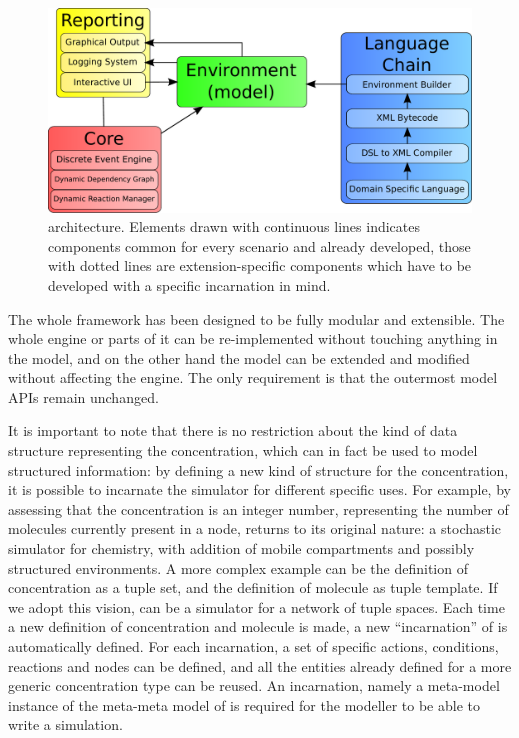 \documentclass[12pt,a4paper,twoside,openright]{book}
\begin{document}
\label{subsec:architecture}
\begin{figure}%
  \begin{center}
    \includegraphics[width=0.9\columnwidth]{img/schemas/architecture}
    \caption[\alchemist{} architecture]{\alchemist{} architecture. Elements drawn with continuous lines indicates components common for every scenario and already developed, those with dotted lines are extension-specific components which have to be developed with a specific incarnation in mind.}
    \label{img:arch}
  \end{center}
\end{figure}

The whole framework has been designed to be fully modular and extensible.
%
The whole engine or parts of it can be re-implemented without touching anything in the model, and on the other hand the model can be extended and modified without affecting the engine.
%
The only requirement is that the outermost model APIs remain unchanged.

It is important to note that there is no restriction about the kind of data structure representing the concentration, which can in fact be used to model structured information: by defining a new kind of structure for the concentration, it is possible to incarnate the simulator for different specific uses.
%
For example, by assessing that the concentration is an integer number, representing the number of molecules currently present in a node, \alchemist{} returns to its original nature: a stochastic simulator for chemistry, with addition of mobile compartments and possibly structured environments.
%
A more complex example can be the definition of concentration as a tuple set, and the definition of molecule as tuple template.
%
If we adopt this vision, \alchemist{} can be a simulator for a network of tuple spaces.
%
Each time a new definition of concentration and molecule is made, a new ``incarnation'' of \alchemist{} is automatically defined. For each incarnation, a set of specific actions, conditions, reactions and nodes can be defined, and all the entities already defined for a more generic concentration type can be reused.
%
An incarnation, namely a meta-model instance of the meta-meta model of \alchemist{} is required for the modeller to be able to write a simulation.
\end{document}

